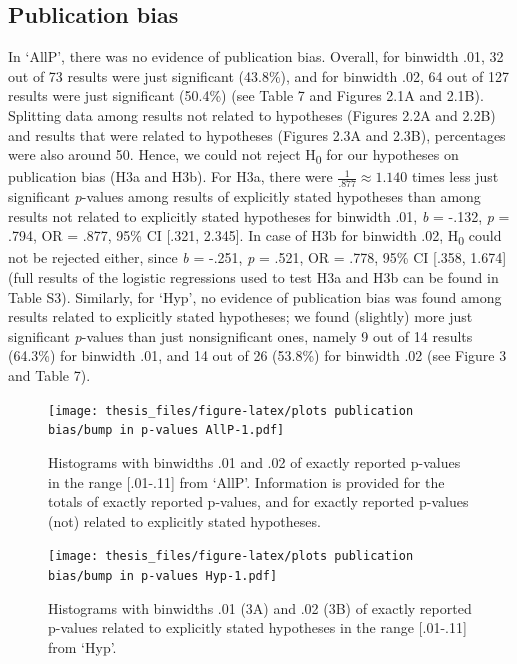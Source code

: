 \documentclass[
  12pt,
]{article}
\begin{document}
\hypertarget{publication-bias}{%
\subsection{Publication bias}\label{publication-bias}}

In `AllP', there was no evidence of publication bias. Overall, for
binwidth .01, 32 out of 73 results were just significant (43.8\%), and
for binwidth .02, 64 out of 127 results were just significant (50.4\%)
(see Table 7 and Figures 2.1A and 2.1B). Splitting data among results
not related to hypotheses (Figures 2.2A and 2.2B) and results that were
related to hypotheses (Figures 2.3A and 2.3B), percentages were also
around 50. Hence, we could not reject H\textsubscript{0} for our
hypotheses on publication bias (H3a and H3b). For H3a, there were
\(\frac{1}{.877} \approx 1.140\) times less just significant
\emph{p}-values among results of explicitly stated hypotheses than among
results not related to explicitly stated hypotheses for binwidth .01,
\emph{b} = -.132, \emph{p} = .794, OR = .877, 95\% CI {[}.321, 2.345{]}.
In case of H3b for binwidth .02, H\textsubscript{0} could not be
rejected either, since \emph{b} = -.251, \emph{p} = .521, OR = .778,
95\% CI {[}.358, 1.674{]} (full results of the logistic regressions used
to test H3a and H3b can be found in Table S3). Similarly, for `Hyp', no
evidence of publication bias was found among results related to
explicitly stated hypotheses; we found (slightly) more just significant
\emph{p}-values than just nonsignificant ones, namely 9 out of 14
results (64.3\%) for binwidth .01, and 14 out of 26 (53.8\%) for
binwidth .02 (see Figure 3 and Table 7).

\begin{figure}
\centering
\texttt{[image: thesis\_files/figure-latex/plots publication bias/bump in p-values AllP-1.pdf]}
\caption{Histograms with binwidths .01 and .02 of exactly reported
p-values in the range {[}.01-.11{]} from `AllP'. Information is provided
for the totals of exactly reported p-values, and for exactly reported
p-values (not) related to explicitly stated hypotheses.}
\end{figure}

\begin{figure}
\centering
\texttt{[image: thesis\_files/figure-latex/plots publication bias/bump in p-values Hyp-1.pdf]}
\caption{Histograms with binwidths .01 (3A) and .02 (3B) of exactly
reported p-values related to explicitly stated hypotheses in the range
{[}.01-.11{]} from `Hyp'.}
\end{figure}
\end{document}
